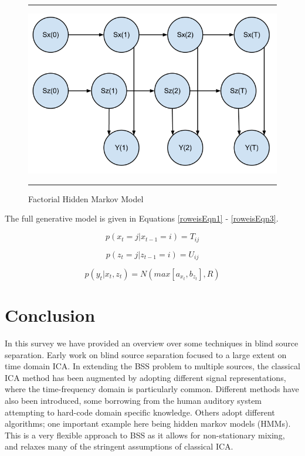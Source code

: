 \begin{figure}[h]
  \centering
  \hrule
  \includegraphics[width = .9\textwidth]{f_hmm}
  \hrule
  \caption{Factorial Hidden Markov Model}
  \label{fhmm_figure}
\end{figure}

The full generative model is given in Equations \ref{roweisEqn1} - \ref{roweisEqn3}.

\begin{equation}\label{roweisEqn1}
  p(x_{t}=j|x_{t-1}=i)=T_{ij}
\end{equation}

\begin{equation}\label{roweisEqn2}
  p(z_{t}=j|z_{t-1}=i)=U_{ij}  
\end{equation}

\begin{equation}\label{roweisEqn3}
  p(y_{t}|x_{t},z_{t})=N(max[a_{x_{t}},b_{z_{t}}], R)  
\end{equation}


\section{Conclusion}\label{conclusion}

In this survey we have provided an overview over some techniques in
blind source separation. Early work on blind source separation focused
to a large extent on time domain ICA. In extending the BSS problem to
multiple sources, the classical ICA method has been augmented by
adopting different signal representations, where the time-frequency
domain is particularly common. Different methods have also been
introduced, some borrowing from the human auditory system attempting
to hard-code domain specific knowledge. Others adopt different
algorithms; one important example here being hidden markov models
(HMMs). This is a very flexible approach to BSS as it allows for
non-stationary mixing, and relaxes many of the stringent assumptions
of classical ICA. 

